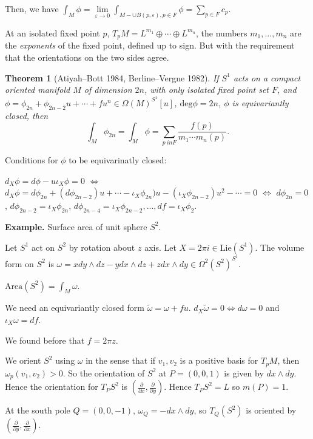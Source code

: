 \documentclass{article}
\theoremstyle{mystyle}
\newtheorem*{theorem*}{Theorem}
\theoremstyle{remark}
\numberwithin{equation}{section}
\begin{document}
Then, we have $\int_M \phi = \lim\limits_{\varepsilon\rightarrow 0} \int_{M-\cup B(p,\varepsilon),p\in F} \phi
=\sum\limits_{p \in F} c_p$.

At an isolated fixed point $p$, $T_pM = L^{m_1}\oplus \cdots \oplus L^{m_n}$, the numbers $m_1,...,m_n$ are the \emph{exponents} of the fixed point, defined up to sign. But with the requirement that the orientations on the two sides agree.


\begin{theorem*}[Atiyah--Bott 1984, Berline--Vergne 1982]
If $S^1$ acts on a compact oriented manifold $M$ of dimension $2n$, with only isolated fixed point set $F$, and $\phi = \phi_{2n} + \phi_{2n-2}u + \cdots + f u^n \in \Omega(M)^{S^1}[u]$, $\mathrm{deg}\phi = 2n$, $\phi$ is equivariantly closed, then
$$\int_M\phi_{2n} = \int_M \phi = \sum\limits_{p\ in F} \frac{f(p)}{m_1\cdots m_n(p)}.$$
\end{theorem*}


Conditions for $\phi$ to be equivarinatly closed:

$d_X\phi = d\phi - u \iota_X\phi=0$ $\Leftrightarrow$ $d_X\phi
=d\phi_{2n}+(d\phi_{2n-2})u+\cdots -\iota_X \phi_{2n})u - (\iota_X\phi_{2n-2})u^2 -\cdots = 0$ $\Leftrightarrow$ $d\phi_{2n}=0$, $d\phi_{2n-2} = \iota_X\phi_{2n}$, $d\phi_{2n-4} = \iota_X\phi_{2n-2},..., df = \iota_X\phi_2$.


\noindent \textbf{Example.} Surface area of unit sphere $S^2$. 

Let $S^1$ act on $S^2$ by rotation about $z$ axis. Let $X = 2\pi i \in \mathrm{Lie}(S^1)$. The volume form on $S^2$ is $\omega = x dy \wedge dz- ydx\wedge dz +z dx \wedge dy \in \Omega^2(S^2)^{S^1}$. 

$\mathrm{Area}(S^2) = \int_M\omega$. 

We need an equivariantly closed form $\widetilde{\omega} = \omega + fu$. $d_X\widetilde{\omega} = 0\Leftrightarrow d\omega = 0$ and $\iota_X \omega = df$. 


We found before that $f = 2\pi z$.

We orient $S^2$ using $\omega$ in the sense that if $v_1,v_2$ is a positive basis for $T_pM$, then $\omega_p(v_1,v_2)>0$. So the orientation of $S^2$ at $P = (0,0,1)$ is given by $dx\wedge dy$. Hence the orientation for $T_PS^2$ is $(\frac{\partial}{\partial x},\frac{\partial}{\partial y})$. Hence $T_PS^2 = L$ so $m(P) = 1$. 

At the south pole $Q=(0,0,-1)$, $\omega_Q = -dx \wedge dy$, so $T_Q(S^2)$ is oriented by $(\frac{\partial}{\partial y},\frac{\partial}{\partial x})$. 
\end{document}
